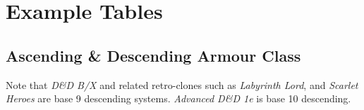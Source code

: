 \documentclass[bg=full, a4paper, 10pt, twoside, twocolumn, openany, nodeprecatedcode]{dndbook}
\begin{document}
\section{Example Tables}

\subsection{Ascending \& Descending Armour Class}\label{gm:ac_conversion}
Note that \emph{D\&D B/X} and related retro-clones such as \emph{Labyrinth
Lord}, and \emph{Scarlet Heroes} are base 9 descending systems. \emph{Advanced
D\&D 1e} is base 10 descending.


\end{document}
